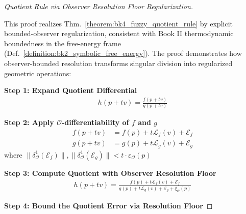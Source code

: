 \begin{proof}[Quotient Rule via Observer Resolution Floor Regularization]
\label{proof:bk4_sketch_observer_resolution_floor}
\leavevmode

This proof realizes Thm.~\ref{theorem:bk4_fuzzy_quotient_rule} by explicit bounded-observer regularization, consistent with Book II thermodynamic boundedness in the free-energy frame (Def.~\ref{definition:bk2_symbolic_free_energy}).
The proof demonstrates how observer-bounded resolution transforms singular division into regularized geometric operations:

\textbf{Step 1: Expand Quotient Differential}
\begin{align}
h(p + tv) = \frac{f(p + tv)}{g(p + tv)}
\end{align}

\textbf{Step 2: Apply $\mathcal{O}$-differentiability of $f$ and $g$}
\begin{align}
f(p + tv) &= f(p) + t\mathcal{L}_f(v) + \mathcal{E}_f \\
g(p + tv) &= g(p) + t\mathcal{L}_g(v) + \mathcal{E}_g
\end{align}
where $\|\delta^1_{\mathcal{O}}(\mathcal{E}_f)\|, \|\delta^1_{\mathcal{O}}(\mathcal{E}_g)\| < t \cdot \varepsilon_{\mathcal{O}}(p)$

\textbf{Step 3: Compute Quotient with Observer Resolution Floor}
\begin{align}
h(p + tv) = \frac{f(p) + t\mathcal{L}_f(v) + \mathcal{E}_f}{g(p) + t\mathcal{L}_g(v) + \mathcal{E}_g + \xi_{\mathcal{O}}(p)}
\end{align}

\textbf{Step 4: Bound the Quotient Error via Resolution Floor}


\end{proof}
